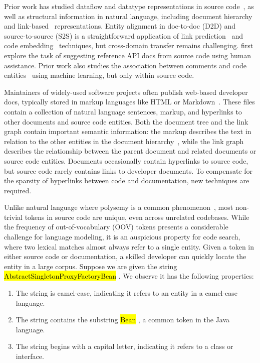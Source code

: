 \documentclass{article}
\newcommand{\tinline}[1]{%
    \begingroup%
    \sethlcolor{slightgray}%
    \hl{\ttfamily\footnotesize #1}%
    \endgroup
}
\begin{document}
Prior work has studied dataflow and datatype representations in source code~\citep{si2018learning, gu2018deep, liu2019neural}, as well as structural information in natural language, including document hierarchy~\citep{yang2016hierarchical} and link-based~\citep{zhang2018link} representations. Entity alignment in doc-to-doc (D2D) and source-to-source (S2S) is a straightforward application of link prediction~\citep{zhang2018link} and code embedding~\citep{gu2018deep} techniques, but cross-domain transfer remains challenging. \citet{robillard2015recommending, robillard2017demand} first explore the task of suggesting reference API docs from source code using human assistance. Prior work also studies the association between comments and code entities~\citep{iyer2018mapping, panthaplackel2020associating} using machine learning, but only within source code.

Maintainers of widely-used software projects often publish web-based developer docs, typically stored in markup languages like HTML or Markdown~\citep{terrasa2018using}. These files contain a collection of natural language sentences, markup, and hyperlinks to other documents and source code entities. Both the document tree and the link graph contain important semantic information: the markup describes the text in relation to the other entities in the document hierarchy~\citep{yang2016hierarchical}, while the link graph describes the relationship between the parent document and related documents or source code entities. Documents occasionally contain hyperlinks to source code, but source code rarely contains links to developer documents. To compensate for the sparsity of hyperlinks between code and documentation, new techniques are required.

Unlike natural language where polysemy is a common phenomenon~\citep{ganea2016probabilistic}, most non-trivial tokens in source code are unique, even across unrelated codebases. While the frequency of out-of-vocabulary (OOV) tokens presents a considerable challenge for language modeling, it is an auspicious property for code search, where two lexical matches almost always refer to a single entity. Given a token in either source code or documentation, a skilled developer can quickly locate the entity in a large corpus. Suppose we are given the string \tinline{AbstractSingletonProxyFactoryBean}. We observe it has the following properties:

\begin{enumerate}
    \item The string is camel-case, indicating it refers to an entity in a camel-case language.
    \item The string contains the substring \tinline{Bean}, a common token in the Java language.
    \item The string begins with a capital letter, indicating it refers to a class or interface.
\end{enumerate}
\end{document}
